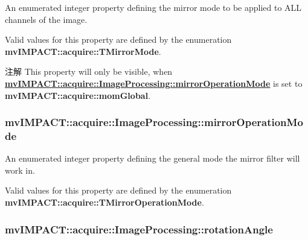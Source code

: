 An enumerated integer property defining the mirror mode to be applied to A\+L\+L channels of the image. 

Valid values for this property are defined by the enumeration {\bfseries mv\+I\+M\+P\+A\+C\+T\+::acquire\+::\+T\+Mirror\+Mode}.

\begin{DoxyNote}{注解}
This property will only be visible, when {\bfseries \hyperlink{classmv_i_m_p_a_c_t_1_1acquire_1_1_image_processing_afe70a375bdb82e907a6d420c9f40b246}{mv\+I\+M\+P\+A\+C\+T\+::acquire\+::\+Image\+Processing\+::mirror\+Operation\+Mode}} is set to {\bfseries mv\+I\+M\+P\+A\+C\+T\+::acquire\+::mom\+Global}. 
\end{DoxyNote}
\hypertarget{classmv_i_m_p_a_c_t_1_1acquire_1_1_image_processing_afe70a375bdb82e907a6d420c9f40b246}{
\subsubsection[{mirror\+Operation\+Mode}]{ mv\+I\+M\+P\+A\+C\+T\+::acquire\+::\+Image\+Processing\+::mirror\+Operation\+Mode}}\label{classmv_i_m_p_a_c_t_1_1acquire_1_1_image_processing_afe70a375bdb82e907a6d420c9f40b246}


An enumerated integer property defining the general mode the mirror filter will work in. 

Valid values for this property are defined by the enumeration {\bfseries mv\+I\+M\+P\+A\+C\+T\+::acquire\+::\+T\+Mirror\+Operation\+Mode}. \hypertarget{classmv_i_m_p_a_c_t_1_1acquire_1_1_image_processing_a92070a7aa140d8f1e202df70c4b3fb7c}{
\subsubsection[{rotation\+Angle}]{ mv\+I\+M\+P\+A\+C\+T\+::acquire\+::\+Image\+Processing\+::rotation\+Angle}}\label{classmv_i_m_p_a_c_t_1_1acquire_1_1_image_processing_a92070a7aa140d8f1e202df70c4b3fb7c}


